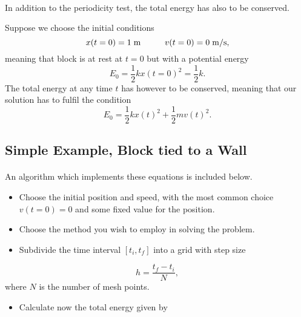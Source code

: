 \documentclass[%
oneside,                 %
final,                   %
10pt]{article}
\begin{document}
\paragraph{}
In addition to the periodicity test, the total energy has also to be conserved. 

Suppose we choose the initial conditions 
\[
     x(t=0)=1\hspace{0.1cm} \mathrm{m}\hspace{1cm} v(t=0)=0\hspace{0.1cm}\mathrm{m/s},
\]
meaning that block is at rest at $t=0$ but with a potential energy
\[
    E_0=\frac{1}{2}kx(t=0)^2=\frac{1}{2}k.
\]
The total energy at any time $t$ has however to be conserved, meaning that our solution has to fulfil the condition
\[
    E_0=\frac{1}{2}kx(t)^2+\frac{1}{2}mv(t)^2.
\]



\subsection{Simple Example, Block tied to a Wall}

\paragraph{}
An algorithm which implements these equations is included below.
\begin{itemize}
 \item Choose the initial position and speed, with the most common choice $v(t=0)=0$ and some fixed value for the position. 

 \item Choose the method you wish to employ in solving the problem.

 \item Subdivide the time interval $[t_i,t_f] $ into a grid with step size
\end{itemize}

\noindent
       \[
	  h=\frac{t_f-t_i}{N},
      \]
where $N$ is the number of mesh points. 
\begin{itemize}
 \item Calculate now the total energy given by 
\end{itemize}
\end{document}
